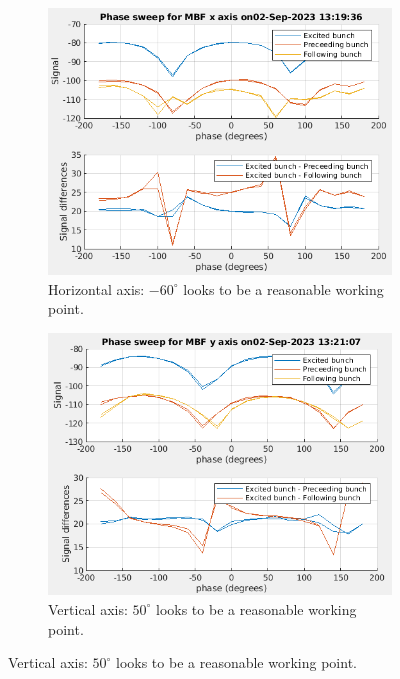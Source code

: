 \documentclass{report}
\begin{document}
\begin{figure}[hbt]
   \centering
    \begin{subfigure}[b]{0.45\textwidth}
        \includegraphics[width=\textwidth]{vlr_system_phase_scan_x.png}
        \caption{Horizontal axis: $-60^\circ$ looks to be a reasonable working point.}
        \label{fig:frontend_system_phase_scan_x}
    \end{subfigure}
    \begin{subfigure}[b]{0.45\textwidth}
        \includegraphics[width=\textwidth]{vlr_system_phase_scan_y.png}
        \caption{Vertical axis: $50^\circ$ looks to be a reasonable working point.}
        \label{fig:frontend_system_phase_scan_y}
    \end{subfigure}
    

\end{figure}
\end{document}
